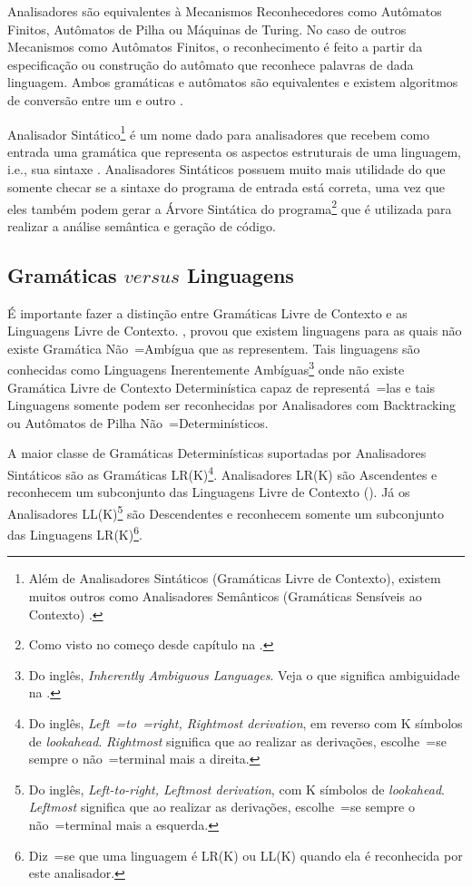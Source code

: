 Analisadores são equivalentes à Mecanismos Reconhecedores como Autômatos Finitos,
Autômatos de Pilha ou
Máquinas de Turing.
No caso de outros Mecanismos como Autômatos Finitos,
o reconhecimento é feito a partir da especificação ou
construção do autômato que reconhece palavras de dada linguagem.
Ambos gramáticas e
autômatos são equivalentes e
existem algoritmos de conversão entre um e
outro \cite{hopcroftBook}.

Analisador Sintático\footnote{
Além de Analisadores Sintáticos (Gramáticas Livre de Contexto),
existem muitos outros como Analisadores Semânticos (Gramáticas Sensíveis ao Contexto) \cite{contextSensitiveParsing}.
}
é um nome dado para analisadores que recebem como entrada uma gramática que representa os aspectos estruturais de uma linguagem,
i.e.,
sua sintaxe \cite{ahoCompilerDragonBook}.
Analisadores Sintáticos possuem muito mais utilidade do que somente checar se a sintaxe do programa de entrada está correta,
uma vez que eles também podem gerar a Árvore Sintática do programa\footnote{
Como visto no começo desde capítulo na .
}
que é utilizada para realizar a análise semântica e
geração de código.


\subsection{Gramáticas $versus$ Linguagens}
\label{gramaticasVersusLinguagens}

É importante fazer a distinção entre Gramáticas Livre de Contexto e
as Linguagens Livre de Contexto.
,
provou que existem linguagens para as quais não existe Gramática Não~=Ambígua que as representem.
Tais linguagens são conhecidas como Linguagens Inerentemente Ambíguas\footnote{
Do inglês,
\textit{Inherently Ambiguous Languages}.
Veja o que significa ambiguidade na .
}
onde não existe Gramática Livre de Contexto Determinística capaz de representá~=las e
tais Linguagens somente podem ser reconhecidas por Analisadores com Backtracking \cite{ahoCompilerDragonBook} ou
Autômatos de Pilha Não~=Determinísticos.

A maior classe de Gramáticas Determinísticas suportadas por Analisadores Sintáticos são as Gramáticas LR(K)\footnote{
Do inglês, \textit{Left~=to~=right, Rightmost derivation},
em reverso com K símbolos de \textit{lookahead}.
\textit{Rightmost} significa que ao realizar as derivações,
escolhe~=se sempre o não~=terminal mais a direita.
}.
Analisadores LR(K) \cite{ahoCompilerDragonBook} são Ascendentes e
reconhecem um subconjunto das Linguagens Livre de Contexto ().
Já os Analisadores LL(K)\footnote{
Do inglês, \textit{Left-to-right, Leftmost derivation},
com K símbolos de \textit{lookahead}.
\textit{Leftmost} significa que ao realizar as derivações,
escolhe~=se sempre o não~=terminal mais a esquerda.
}
são Descendentes \cite{antlrBookTerrentParr,llStarAntlr,allStarAntlr} e
reconhecem somente um subconjunto das Linguagens LR(K)\footnote{
Diz~=se que uma linguagem é LR(K) ou
LL(K) quando ela é reconhecida por este analisador.
}.

